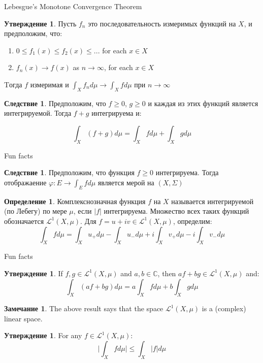 \documentclass{beamer}%
\theoremstyle{definition}
\newtheorem{mydef}[theorem]{Определение}
\newtheorem{proposition}[theorem]{Утверждение}
\newtheorem{remark}[theorem]{Замечание}
\newtheorem{mycol}[theorem]{Следствие}
\begin{document}
\begin{frame}{Lebesgue’s Monotone Convergence Theorem   }
\begin{proposition}
Пусть $f_n$ это последовательность измеримых функций на $X$, и предположим, что:
    \begin{enumerate}
        \item $0 \leq f_1(x) \leq f_2(x) \leq ...$ for each $x \in X$
        \item $f_n(x) \rightarrow f(x)$ as $n \rightarrow \infty$, for each $x \in X$
    \end{enumerate}
Tогда $f $  измеримая и $\int_{X} f_{n} d\mu \rightarrow \int_{X} f d \mu$ при $n \rightarrow \infty$
\end{proposition}

\begin{mycol}
    Предположим, что $f \geq 0$, $g \geq 0$ и каждая из этих функций является интегрируемой. Тогда $f + g$ интегрируема и:
    
    \[\int_{X} (f + g) d\mu = \int_{X} f d\mu + \int_{X} g d\mu \] 
\end{mycol}

\end{frame}

\begin{frame}{Fun facts}
\begin{mycol}
    Предположим, что функция $f \geq 0 $ интегрируема. Тогда
    отображаение $\varphi: E \rightarrow \int_{E} f d\mu$ является мерой на $(X, \Sigma)$
\end{mycol}

\begin{mydef}
    Комплекснозначная функция $f$ на $X$ называется интегрируемой (по Лебегу) по мере $\mu$, если $|f|$ интегрируема. Множество всех таких функций обозначается $\mathcal{L}^1(X, \mu)$. Для $f = u + iv \in \mathcal{L}^1(X, \mu)$, определим:
    \[\int_X fd\mu  = \int_X u_+d\mu -\int_X u_-d\mu + i\int_X v_+d\mu - i\int_X v_-d\mu\]
\end{mydef}


\end{frame}

\begin{frame}{Fun facts}
\begin{proposition}
     If $f,g \in \mathcal{L}^1(X,\mu)$ and $a, b \in \mathbb{C}$, then $af +bg \in  \mathcal{L}^1(X,\mu)$ and:
    \[\int_{X} (af + bg) d\mu = a\int_{X} f d\mu + b\int_{X} g d\mu \]
\end{proposition}

    
\begin{remark}
The above result says that the space $\mathcal{L}^1(X,\mu)$ is a (complex) linear space.
\end{remark}

\begin{proposition}
     For any $f \in \mathcal{L}^1(X,\mu)$:
     \[\Big|\int_X fd\mu\Big| \leq \int_X |f|d\mu\]
\end{proposition}
\end{frame}
\end{document}
